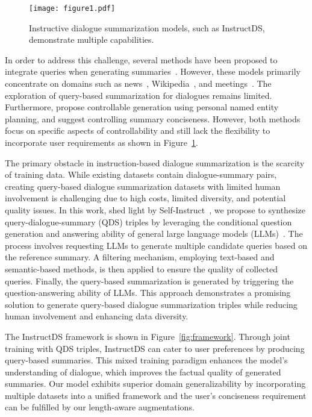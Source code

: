 \documentclass[11pt]{article}
\begin{document}
\begin{figure}[t]
        \centering
         \texttt{[image: figure1.pdf]}
        \caption{Instructive dialogue summarization models, such as InstructDS, demonstrate multiple capabilities.}
        \label{fig:example_dialogue}
    \end{figure}


    In order to address this challenge, several methods have been proposed to integrate queries when generating summaries~\cite{dang2006duc,nema-etal-2017-diversity,su-etal-2021-improve,zhong-etal-2021-qmsum,zhu2022transforming,he-etal-2022-ctrlsum}. However, these models primarily concentrate on domains such as news~\cite{dang2006duc,he-etal-2022-ctrlsum}, Wikipedia~\cite{zhu2022transforming}, and meetings~\cite{zhong-etal-2021-qmsum}. The exploration of query-based summarization for dialogues remains limited. Furthermore, \citet{liu-chen-2021-controllable} propose controllable generation using personal named entity planning, and \citet{wang2022focused} suggest controlling summary conciseness. However, both methods focus on specific aspects of controllability and still lack the flexibility to incorporate user requirements as shown in Figure~\ref{fig:example_dialogue}.

    The primary obstacle in instruction-based dialogue summarization is the scarcity of training data. While existing datasets contain dialogue-summary pairs, creating query-based dialogue summarization datasets with limited human involvement is challenging due to high costs, limited diversity, and potential quality issues. In this work, shed light by Self-Instruct~\cite{selfinstruct}, we propose to synthesize query-dialogue-summary (QDS) triples by leveraging the conditional question generation and answering ability of general large language models (LLMs)~\cite{wei2023overview}. The process involves requesting LLMs to generate multiple candidate queries based on the reference summary. A filtering mechanism, employing text-based and semantic-based methods, is then applied to ensure the quality of collected queries. Finally, the query-based summarization is generated by triggering the question-answering ability of LLMs. This approach demonstrates a promising solution to generate query-based dialogue summarization triples while reducing human involvement and enhancing data diversity.

    The InstructDS framework is shown in Figure~\ref{fig:framework}. Through joint training with QDS triples, InstructDS can cater to user preferences by producing query-based summaries. This mixed training paradigm enhances the model's understanding of dialogue, which improves the factual quality of generated summaries. Our model exhibits superior domain generalizability by incorporating multiple datasets into a unified framework and the user's conciseness requirement can be fulfilled by our length-aware augmentations.
\end{document}
